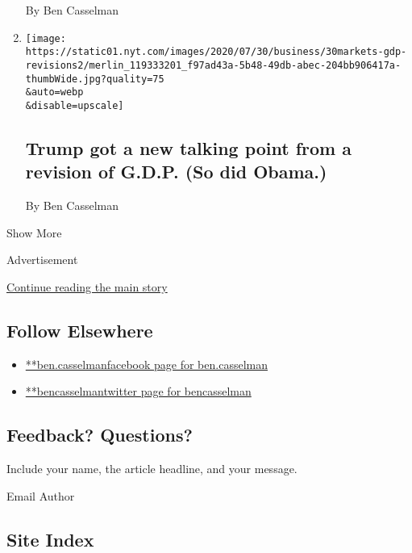 \begin{enumerate}
  By Ben Casselman
\item
  \href{/2020/07/30/business/trump-got-a-new-talking-point-from-a-revision-of-gdp-so-did-obama.html}{}

  \texttt{[image: https://static01.nyt.com/images/2020/07/30/business/30markets-gdp-revisions2/merlin\_119333201\_f97ad43a-5b48-49db-abec-204bb906417a-thumbWide.jpg?quality=75\\\&auto=webp\\\&disable=upscale]}

  \hypertarget{trump-got-a-new-talking-point-from-a-revision-of-gdp-so-did-obama}{%
  \subsection{Trump got a new talking point from a revision of G.D.P.
  (So did
  Obama.)}\label{trump-got-a-new-talking-point-from-a-revision-of-gdp-so-did-obama}}

  By Ben Casselman
\end{enumerate}

Show More

Advertisement

\protect\hyperlink{after-mid2}{Continue reading the main story}

\hypertarget{follow-elsewhere}{%
\subsection{Follow Elsewhere}\label{follow-elsewhere}}

\begin{itemize}
\tightlist
\item
  \href{https://www.facebook.com/ben.casselman}{**ben.casselmanfacebook
  page for ben.casselman}
\item
  \href{https://twitter.com/bencasselman}{**bencasselmantwitter page for
  bencasselman}
\end{itemize}

\hypertarget{feedback-questions}{%
\subsection{Feedback? Questions?}\label{feedback-questions}}

Include your name, the article headline, and your message.

Email Author

\hypertarget{site-index}{%
\subsection{Site Index}\label{site-index}}

